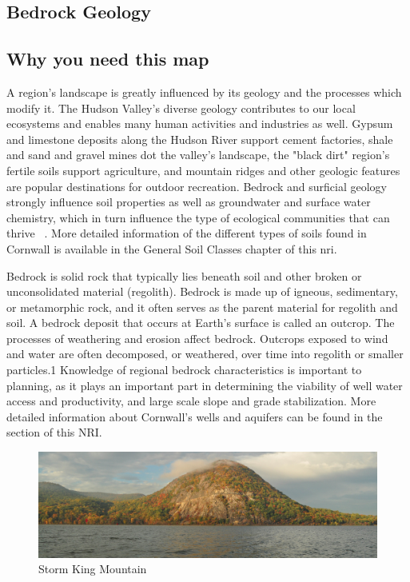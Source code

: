 \subsection{Bedrock Geology}\label{subsec:bedrock}
\subsection*{Why you need this map}
A region's landscape is greatly influenced by its geology and the processes 
which modify it. The Hudson Valley’s diverse geology contributes to our local 
ecosystems and enables many human activities and industries as well. Gypsum and 
limestone deposits along the Hudson River support cement factories, shale and 
sand and gravel mines dot the valley’s landscape, the "black dirt" region’s 
fertile soils support agriculture, and mountain ridges and other geologic 
features are popular destinations for outdoor recreation. Bedrock and surficial 
geology strongly influence soil properties as well as groundwater and surface 
water chemistry, which in turn influence the type of ecological communities that 
can thrive ~\citep{haeckel2014}. More detailed information of the different types 
of soils found in Cornwall is available in the General Soil Classes chapter of 
this \gls{nri}.

Bedrock is solid rock that typically lies beneath soil and other broken or 
unconsolidated material (regolith). Bedrock is made up of igneous, sedimentary, 
or metamorphic rock, and it often serves as the parent material for regolith 
and soil. A bedrock deposit that occurs at Earth’s surface is called an 
outcrop. The processes of weathering and erosion affect bedrock. Outcrops 
exposed to wind and water are often decomposed, or weathered, over time into 
regolith or smaller particles.1 Knowledge of regional bedrock characteristics is 
important to planning, as it plays an important part in determining the 
viability of well water access and productivity, and large scale slope and grade 
stabilization. More detailed information about Cornwall's wells and aquifers can 
be found in the ~ section of this NRI.

\begin{figure}
  \begin{centering}
    \includegraphics[width=\textwidth]{images/stormking.jpg}
    \vspace{-10pt}
    \caption{Storm King Mountain}\label{fig:stormking}
  \end{centering}
\end{figure}

